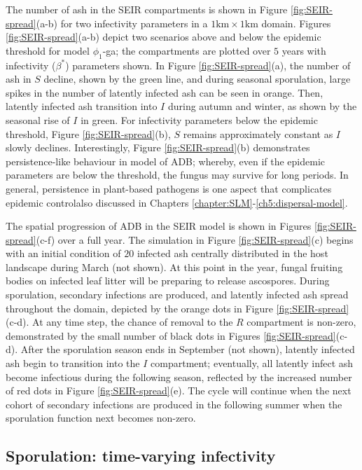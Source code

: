 The number of ash in the SEIR compartments is shown in Figure \ref{fig:SEIR-spread}(a-b) for two infectivity parameters in a $1\mathrm{km}\times1\mathrm{km}$ domain.
Figures \ref{fig:SEIR-spread}(a-b) depict two scenarios above and below the epidemic threshold for model $\phi_1$-ga;
the compartments are plotted over $5$ years with infectivity ($\beta^*$) parameters shown. 
In Figure \ref{fig:SEIR-spread}(a), the number of ash in $S$ decline, shown by the green line,
and during seasonal sporulation, large spikes in the number of latently infected ash can be seen in orange. 
Then, latently infected ash transition into $I$ during autumn and winter, as shown by the seasonal rise of $I$ in green.
For infectivity parameters below the epidemic threshold, Figure \ref{fig:SEIR-spread}(b), $S$ remains approximately constant as $I$ slowly declines. 
Interestingly, Figure \ref{fig:SEIR-spread}(b) demonstrates persistence-like behaviour in model of ADB; 
whereby, even if the epidemic parameters are below the threshold, the fungus may survive for long periods. 
In general, persistence in plant-based pathogens is one aspect that complicates epidemic control\textemdash also discussed in Chapters \ref{chapter:SLM}-\ref{ch5:dispersal-model}.

The spatial progression of ADB in the SEIR model is shown in Figures \ref{fig:SEIR-spread}(c-f) over a full year. 
The simulation in Figure \ref{fig:SEIR-spread}(c) begins with an initial condition of $20$ infected ash centrally distributed in the host landscape during March (not shown). 
At this point in the year, fungal fruiting bodies on infected leaf litter will be preparing to release ascospores.
During sporulation, secondary infections are produced, and latently infected ash spread throughout the domain, depicted by the orange dots in Figure \ref{fig:SEIR-spread}(c-d). 
At any time step, the chance of removal to the $R$ compartment is non-zero, demonstrated by the small number of black dots in Figures \ref{fig:SEIR-spread}(c-d).
After the sporulation season ends in September (not shown), latently infected ash begin to transition into the $I$ compartment;
eventually, all latently infect ash become infectious during the following season, reflected by the increased number of red dots in Figure \ref{fig:SEIR-spread}(e). 
The cycle will continue when the next cohort of secondary infections are produced in the following summer when the sporulation function next becomes non-zero.

\subsection{Sporulation: time-varying infectivity}
\label{ch6:sporulation}

